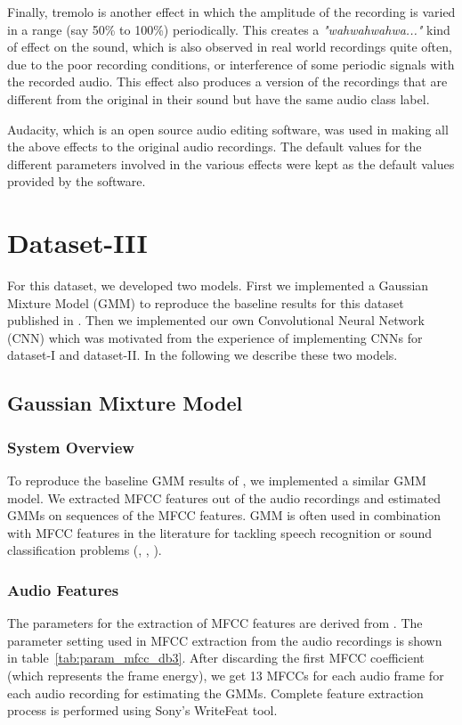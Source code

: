 Finally, tremolo is another effect in which the amplitude of the recording is varied in a range (say 50\% to 100\%) periodically. This creates a \textsl{"wahwahwahwa..."} kind of effect on the sound, which is also observed in real world recordings quite often, due to the poor recording conditions, or interference of some periodic signals with the recorded audio. This effect also produces a version of the recordings that are different from the original in their sound but have the same audio class label.

Audacity, which is an open source audio editing software, was used in making all the above effects to the original audio recordings. The default values for the different parameters involved in the various effects were kept as the default values provided by the software.

\section{Dataset-III}
For this dataset, we developed two models. First we implemented a Gaussian Mixture Model (GMM) to reproduce the baseline results for this dataset published in \cite{foster2015chime}. Then we implemented our own Convolutional Neural Network (CNN) which was motivated from the experience of implementing CNNs for dataset-I and dataset-II. In the following we describe these two models.

\subsection{Gaussian Mixture Model}

\subsubsection{System Overview}
To reproduce the baseline GMM results of \cite{foster2015chime}, we implemented a similar GMM model. We extracted MFCC features out of the audio recordings and estimated GMMs on sequences of the MFCC features. GMM is often used in combination with MFCC features in the literature for tackling speech recognition or sound classification problems (\cite{stowelldetection}, \cite{defreville2006automatic}, \cite{aucouturier2007bag}).

\subsubsection{Audio Features}
The parameters for the extraction of MFCC features are derived from \cite{foster2015chime}. The parameter setting used in MFCC extraction from the audio recordings is shown in table~\ref{tab:param_mfcc_db3}. After discarding the first MFCC coefficient (which represents the frame energy), we get 13 MFCCs for each audio frame for each audio recording for estimating the GMMs. Complete feature extraction process is performed using Sony's WriteFeat tool.

